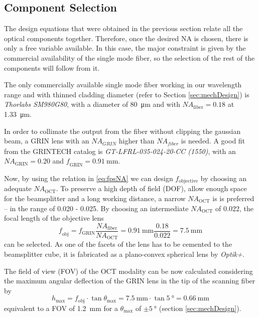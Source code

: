 \subsection{Component Selection}
The design equations that were obtained in the previous section relate all the optical components together. Therefore, once the desired NA is chosen, there is only a free variable available. In this case, the major constraint is given by the commercial availability of the single mode fiber, so the selection of the rest of the components will follow from it.

The only commercially available single mode fiber working in our wavelength range and with thinned cladding diameter (refer to Section \ref{sec:mechDesign}) is \textit{Thorlabs SM980G80}, with a diameter of \SI{80}{\micro\meter} and with $\mathit{NA_\mathrm{fiber}} = 0.18$ at \SI{1.33}{\micro\meter}. 

In order to collimate the output from the fiber without clipping the gaussian beam, a GRIN lens with an $\mathit{NA_{GRIN}}$ higher than $\mathit{NA_{fiber}}$ is needed. A good fit from the GRINTECH catalog is \textit{GT-LFRL-035-024-20-CC (1550)}, with an $\mathit{NA_\mathrm{GRIN}} = 0.20$ and $\mathit{f_\mathrm{GRIN}} = \SI{0.91}{\milli\meter}$. 

Now, by using the relation in \autoref{eq:fpsNA} we can design $f_\mathrm{objective}$ by choosing an adequate $\mathit{NA_\mathrm{OCT}}$. To preserve a high depth of field (DOF), allow enough space for the beamsplitter and a long working distance, a narrow $\mathit{NA_\mathrm{OCT}}$ is is preferred -- in the range of 0.020 - 0.025. By choosing an intermediate $\mathit{NA_\mathrm{OCT}}$ of 0.022, the focal length of the objective lens 
\begin{equation}
\mathit{f_\mathrm{obj}} = f_\mathrm{GRIN} \frac{\mathit{NA_\mathrm{fiber}}}{\mathit{NA_\mathrm{OCT}}}  = \SI{0.91}{\milli\meter} \frac{0.18}{0.022} = \SI{7.5}{\milli\meter}
\end{equation}
can be selected. As one of the facets of the lens has to be cemented to the beamsplitter cube, it is fabricated as a plano-convex spherical lens by \textit{Optik+}.

The field of view (FOV) of the OCT modality can be now calculated considering the maximum angular deflection of the GRIN lens in the tip of the scanning fiber by 
\begin{equation}
h_\mathrm{max} = f_\mathrm{obj}\cdot \tan  \theta_\mathrm{max} = \SI{7.5}{\milli\meter} \cdot \tan \SI{5}{\degree} = \SI{0.66}{\milli\meter} 
\end{equation}
equivalent to a FOV of \SI{1.2}{\milli\meter} for a $\theta_\mathrm{max} $ of $ \pm \SI{5}{\degree}$ (section \ref{sec:mechDesign}).


